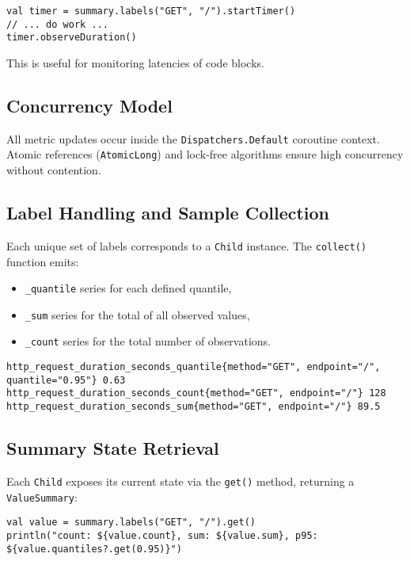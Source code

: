 \begin{verbatim}
val timer = summary.labels("GET", "/").startTimer()
// ... do work ...
timer.observeDuration()
\end{verbatim}

This is useful for monitoring latencies of code blocks.

\subsection{Concurrency Model}

All metric updates occur inside the \texttt{Dispatchers.Default} coroutine context. Atomic references (\texttt{AtomicLong}) and lock-free algorithms ensure high concurrency without contention.

\subsection{Label Handling and Sample Collection}

Each unique set of labels corresponds to a \texttt{Child} instance. The \texttt{collect()} function emits:

\begin{itemize}
    \item \texttt{\_quantile} series for each defined quantile, 
    \item \texttt{\_sum} series for the total of all observed values, 
    \item \texttt{\_count} series for the total number of observations. 
\end{itemize}


\begin{verbatim}
http_request_duration_seconds_quantile{method="GET", endpoint="/", quantile="0.95"} 0.63
http_request_duration_seconds_count{method="GET", endpoint="/"} 128
http_request_duration_seconds_sum{method="GET", endpoint="/"} 89.5
\end{verbatim}

\subsection{Summary State Retrieval}

Each \texttt{Child} exposes its current state via the \texttt{get()} method, returning a \texttt{ValueSummary}:

\begin{verbatim}
val value = summary.labels("GET", "/").get()
println("count: ${value.count}, sum: ${value.sum}, p95: ${value.quantiles?.get(0.95)}")
\end{verbatim}

